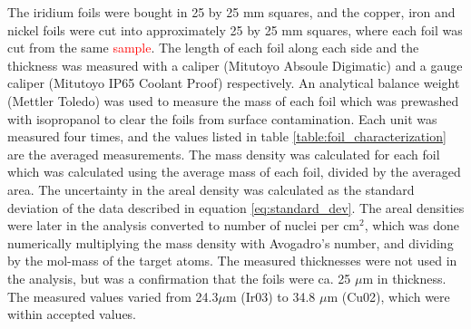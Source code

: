 \noindent 
The iridium foils were bought in 25 by 25 mm squares, and the copper, iron and nickel foils were cut into approximately 25 by 25 mm squares, where each foil was cut from the same \textcolor{red}{sample}. The length of each foil along each side and the thickness was measured with a caliper (Mitutoyo Absoule Digimatic) and a gauge caliper (Mitutoyo IP65 Coolant Proof) respectively. An analytical balance weight (Mettler Toledo) was used to measure the mass of each foil which was prewashed with isopropanol to clear the foils from surface contamination. Each unit was measured four times, and the values listed in table \ref{table:foil_characterization} are the averaged measurements. The mass density was calculated for each foil which was calculated using the average mass of each foil, divided by the averaged area. The uncertainty in the areal density was calculated as the standard deviation of the data described in equation \ref{eq:standard_dev}. The areal densities were later in the analysis converted to number of nuclei per cm$^2$, which was done numerically multiplying the mass density with Avogadro's number, and dividing by the mol-mass of the target atoms. The measured thicknesses were not used in the analysis, but was a confirmation that the foils were ca. 25 $\mu$m in thickness. The measured values varied from 24.3$\mu$m (Ir03) to 34.8 $\mu$m (Cu02), which were within accepted values. 




